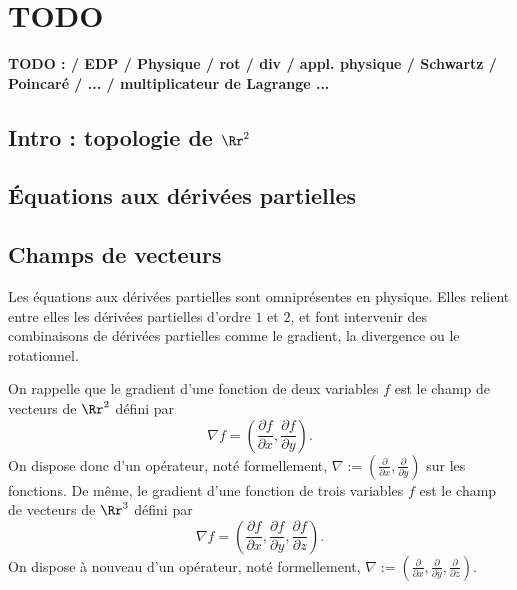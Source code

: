 \documentclass[11pt, class=report,crop=false]{standalone}
\begin{document}

\newcommand{\ou}{\mathscr{O}}
\newcommand{\f}{\mathscr{F}}
\newcommand{\mat}{\mathscr{M}}
\newcommand{\co}{\mathscr{C}}
\newcommand{\ja}{\mathrm{J}}
\newcommand{\jac}{|\mathrm{J}|}
\newcommand{\rot}{\mathrm{rot}}

\section{TODO}


\textbf{TODO :  / EDP / Physique / rot / div / appl. physique / Schwartz / Poincaré / ... / multiplicateur de Lagrange ...}

\subsection{Intro : topologie de $\Rr^2$}

\subsection{Équations aux dérivées partielles}
 

\subsection{}

\subsection{Champs de vecteurs}

\vskip4mm

\noindent Les équations aux dérivées partielles sont omniprésentes en physique. Elles relient entre elles les dérivées partielles d'ordre $1$ et $2$, et font intervenir des combinaisons de dérivées partielles comme le gradient, la divergence ou le rotationnel.

\vskip6mm

\noindent On rappelle que le gradient d'une fonction de deux variables $f$ est le champ de vecteurs de $\Rr^2$ défini par
$$\nabla f=\left(\frac{\partial f}{\partial x},\frac{\partial f}{\partial y}\right).$$
On dispose donc d'un opérateur, noté formellement, $\displaystyle \nabla :=\left(\frac{\partial }{\partial x},\frac{\partial }{\partial y}\right)$ sur les fonctions. De m\^eme, le gradient d'une fonction de trois variables $f$ est le champ de vecteurs de $\Rr^3$ défini par
$$\nabla f=\left(\frac{\partial f}{\partial x},\frac{\partial f}{\partial y},\frac{\partial f}{\partial z}\right).$$
On dispose à nouveau d'un opérateur, noté formellement, $\displaystyle \nabla :=\left(\frac{\partial }{\partial x},\frac{\partial }{\partial y},\frac{\partial }{\partial z}\right)$.
\end{document}
